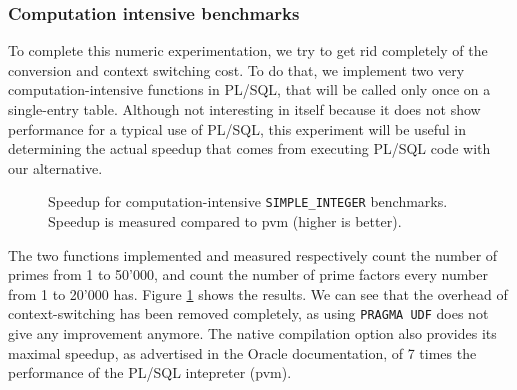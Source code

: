 \documentclass[twoside,11pt,a4paper]{article}
\newcommand{\pls}[1]{\texttt{#1}}
\newcommand{\plstype}[1]{\pls{#1}}
\newcommand{\simpleint}{\plstype{SIMPLE\_INTEGER}}
\newcommand{\benchsystem}[1]{\textsf{#1}}
\newcommand{\pvm}{\benchsystem{pvm}}
\begin{document}
\subsubsection{Computation intensive benchmarks}

To complete this numeric experimentation, we try to get rid completely of the conversion and context switching cost. To do that, we implement two very computation-intensive functions in PL/SQL, that will be called only once on a single-entry table. Although not interesting in itself because it does not show performance for a typical use of PL/SQL, this experiment will be useful in determining the actual speedup that comes from executing PL/SQL code with our alternative.

\begin{figure}[tp]
	\centering
	\caption{Speedup for computation-intensive \simpleint{} benchmarks. Speedup is measured compared to \pvm{} (higher is better).}
	\label{fig:exp1c}
\end{figure}

The two functions implemented and measured respectively count the number of primes from 1 to 50'000, and count the number of prime factors every number from 1 to 20'000 has. Figure \ref{fig:exp1c} shows the results. We can see that the overhead of context-switching has been removed completely, as using \pls{PRAGMA UDF} does not give any improvement anymore. The native compilation option also provides its maximal speedup, as advertised in the Oracle documentation, of 7 times the performance of the PL/SQL intepreter (\pvm{}).
\end{document}
